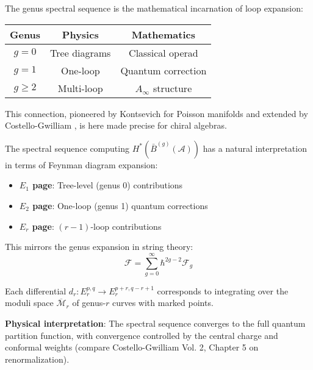 \begin{remark}\label{rem:ss-feynman}
The genus spectral sequence is the mathematical incarnation of loop expansion:

\begin{center}
\begin{tabular}{|c|c|c|}
\hline
\textbf{Genus} & \textbf{Physics} & \textbf{Mathematics} \\
\hline
$g=0$ & Tree diagrams & Classical operad \\
$g=1$ & One-loop & Quantum correction \\
$g \geq 2$ & Multi-loop & $A_\infty$ structure \\
\hline
\end{tabular}
\end{center}

This connection, pioneered by Kontsevich for Poisson manifolds \cite{Kon99} and 
extended by Costello-Gwilliam \cite{CG17}, is here made precise for chiral algebras.
\end{remark}

\begin{remark}\label{rem:genus-spectral-connection}
The spectral sequence computing $H^*(\bar{B}^{(g)}(\mathcal{A}))$ has a natural interpretation in terms of Feynman diagram expansion:

\begin{itemize}
\item \textbf{$E_1$ page}: Tree-level (genus 0) contributions
\item \textbf{$E_2$ page}: One-loop (genus 1) quantum corrections
\item \textbf{$E_r$ page}: $(r-1)$-loop contributions
\end{itemize}

This mirrors the genus expansion in string theory:
$$\mathcal{F} = \sum_{g=0}^{\infty} \hbar^{2g-2} \mathcal{F}_g$$

Each differential $d_r: E_r^{p,q} \to E_r^{p+r, q-r+1}$ corresponds to integrating over the moduli space $\overline{\mathcal{M}}_r$ of genus-$r$ curves with marked points.

\textbf{Physical interpretation}: The spectral sequence converges to the full quantum partition function, with convergence controlled by the central charge and conformal weights (compare Costello-Gwilliam Vol. 2, Chapter 5 on renormalization).
\end{remark}

